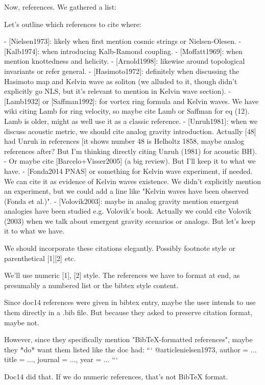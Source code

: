 \documentclass[12pt]{article}
\begin{document}
Now, references. We gathered a list:

Let's outline which references to cite where:

- [Nielsen1973]: likely when first mention cosmic strings or Nielsen-Olesen.
- [Kalb1974]: when introducing Kalb-Ramond coupling.
- [Moffatt1969]: when mention knottedness and helicity.
- [Arnold1998]: likewise around topological invariants or refer general.
- [Hasimoto1972]: definitely when discussing the Hasimoto map and Kelvin wave as soliton (we alluded to it, though didn't explicitly go NLS, but it's relevant to mention in Kelvin wave section).
- [Lamb1932] or [Saffman1992]: for vortex ring formula and Kelvin waves. We have wiki citing Lamb for ring velocity, so maybe cite Lamb or Saffman for eq (12).
  Lamb is older, might as well use it as a classic reference.
- [Unruh1981]: when we discuss acoustic metric, we should cite analog gravity introduction. 
  Actually [48] had Unruh in references [it shows number 48 is Helholtz 1858, maybe analog references after? But I'm thinking directly citing Unruh (1981) for acoustic BH).
- Or maybe cite [Barcelo+Visser2005] (a big review).
  But I'll keep it to what we have.
- [Fonda2014 PNAS] or something for Kelvin wave experiment, if needed.
  We can cite it as evidence of Kelvin waves existence. We didn't explicitly mention an experiment, but we could add a line like "Kelvin waves have been observed (Fonda et al.)".
- [Volovik2003]: maybe in analog gravity mention emergent analogies have been studied e.g. Volovik's book. 
  Actually we could cite Volovik (2003) when we talk about emergent gravity scenarios or analogs.
  But let's keep it to what we have.

We should incorporate these citations elegantly. Possibly footnote style or parenthetical [1][2] etc.

We'll use numeric [1], [2] style. The references we have to format at end, as presumably a numbered list or the bibtex style content.

Since doc14 references were given in bibtex entry, maybe the user intends to use them directly in a .bib file. But because they asked to preserve citation format, maybe not.

However, since they specifically mention "BibTeX-formatted references", maybe they *do* want them listed like the doc had:
```
@article{nielsen1973,
 author = ...
 title = ...,
 journal = ...,
 year = ...}
```

Doc14 did that. If we do numeric references, that’s not BibTeX format.
\end{document}
